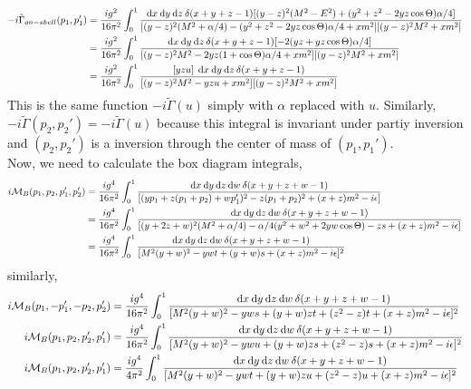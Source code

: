 \documentclass{article}
\begin{document}
\begin{align*} 
- i \tilde{\Gamma}_{on-shell}(p_1, p_1') &= \frac{i g^2}{16 \pi^2} \int_0^1 \frac{\mathrm{d}x \: \mathrm{d}y \: \mathrm{d}z \: \delta(x + y + z - 1) [(y - z)^2 (M^2 -  E^2) + (y^2 + z^2 - 2 yz \cos{\Theta}) \alpha/4 ]}{[(y - z)^2 (M^2 + \alpha/4) - (y^2 + z^2 - 2 yz \cos{\Theta}) \alpha/4 + x m^2][(y - z)^2 M^2  + x m^2]} 
\\
& = \frac{i g^2}{16 \pi^2} \int_0^1 \frac{\mathrm{d}x \: \mathrm{d}y \: \mathrm{d}z \: \delta(x + y + z - 1) [ - 2(yz + yz \cos{\Theta}) \alpha/4 ]}{[(y - z)^2 M^2 -2yz(1 + \cos{\Theta})\alpha/4 + x m^2][(y - z)^2 M^2  + x m^2]}
\\
& = \frac{i g^2}{16 \pi^2} \int_0^1 \frac{[yz u] \: \: \mathrm{d}x \: \mathrm{d}y \: \mathrm{d}z \: \delta(x + y + z - 1) }{[(y - z)^2M^2 - yz u + x m^2][(y - z)^2 M^2  + x m^2]}
\end{align*}
This is the same function $-i \tilde{\Gamma}(u)$ simply with $\alpha$ replaced with $u$. Similarly, $-i \tilde{\Gamma}(p_2, p_2') = -i \tilde{\Gamma}(u)$ because this integral is invariant under partiy inversion and $(p_2, p_2')$ is a inversion through the center of mass of $(p_1, p_1')$. \bigskip\\
Now, we need to calculate the box diagram integrals,
\begin{align*}  
i\mathcal{M}_B(p_1, p_2, p_1', p_2') &= \frac{ig^4}{16 \pi^2} \int_{0}^{1} \frac{\mathrm{d}x \: \mathrm{d}y \: \mathrm{d}z \: \mathrm{d}w \: \delta(x + y + z + w - 1) }{[(y p_1 + z (p_1 + p_2) + w p_1' )^2 - z (p_1 + p_2)^2 + (x + z)m^2 - i \epsilon]} 
\\
& = \frac{ig^4}{16 \pi^2} \int_{0}^{1} \frac{\mathrm{d}x \: \mathrm{d}y \: \mathrm{d}z \: \mathrm{d}w \: \delta(x + y + z + w - 1) }{[(y + 2 z + w)^2 (M^2 + \alpha/4) - \alpha/4(y^2 + w^2 + 2 yw \cos{\Theta}) - z s + (x + z)m^2 - i \epsilon]} 
\\
& = \frac{ig^4}{16 \pi^2} \int_{0}^{1} \frac{\mathrm{d}x \: \mathrm{d}y \: \mathrm{d}z \: \mathrm{d}w \: \delta(x + y + z + w - 1) }{[M^2 (y + w)^2 - yw t + (y + w) s + (x + z)m^2 - i \epsilon]^2} 
\end{align*}
similarly,
\begin{align*}  
i\mathcal{M}_B(p_1, -p_1', -p_2, p_2') & = \frac{ig^4}{16 \pi^2} \int_{0}^{1} \frac{\mathrm{d}x \: \mathrm{d}y \: \mathrm{d}z \: \mathrm{d}w \: \delta(x + y + z + w - 1) }{[M^2 (y + w)^2 - yw s + (y + w)z t + (z^2 - z) t + (x + z)m^2 - i \epsilon]^2} 
\\
i\mathcal{M}_B(p_1, p_2, p_2', p_1') & = \frac{ig^4}{16 \pi^2} \int_{0}^{1} \frac{\mathrm{d}x \: \mathrm{d}y \: \mathrm{d}z \: \mathrm{d}w \: \delta(x + y + z + w - 1) }{[M^2 (y + w)^2 - yw u + (y + w)z s + (z^2 - z) s + (x + z)m^2 - i \epsilon]^2} 
\\
i\mathcal{M}_B(p_1, p_2, p_2', p_1') & = \frac{ig^4}{4 \pi^2} \int_{0}^{1} \frac{\mathrm{d}x \: \mathrm{d}y \: \mathrm{d}z \: \mathrm{d}w \: \delta(x + y + z + w - 1) }{[M^2 (y + w)^2 - yw t + (y + w)z u + (z^2 - z) u + (x + z)m^2 - i \epsilon]^2} 
\end{align*}
\end{document}
